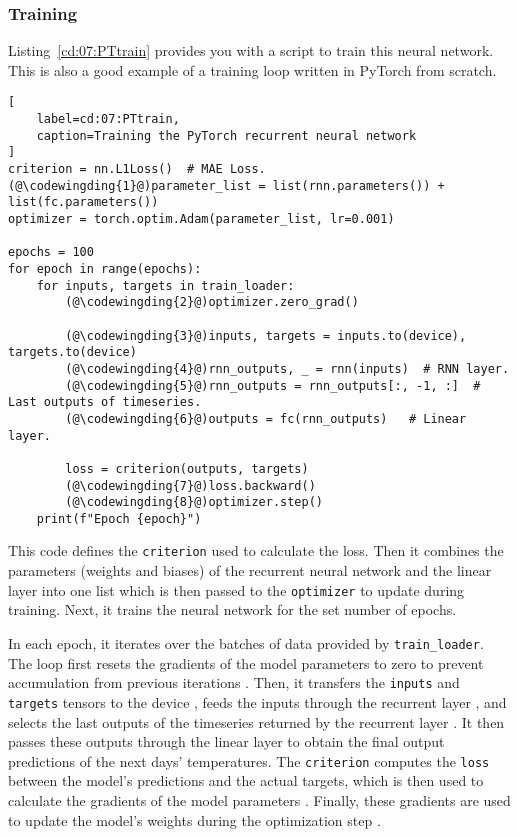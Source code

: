 \subsubsection{Training}

Listing~\ref{cd:07:PTtrain} provides you with a script to train this neural network. This is also a good example of a training loop written in PyTorch from scratch.
\begin{lstlisting}[
    label=cd:07:PTtrain,
    caption=Training the PyTorch recurrent neural network
]
criterion = nn.L1Loss()  # MAE Loss.
(@\codewingding{1}@)parameter_list = list(rnn.parameters()) + list(fc.parameters())
optimizer = torch.optim.Adam(parameter_list, lr=0.001)

epochs = 100
for epoch in range(epochs):
    for inputs, targets in train_loader:
        (@\codewingding{2}@)optimizer.zero_grad()

        (@\codewingding{3}@)inputs, targets = inputs.to(device), targets.to(device)
        (@\codewingding{4}@)rnn_outputs, _ = rnn(inputs)  # RNN layer.
        (@\codewingding{5}@)rnn_outputs = rnn_outputs[:, -1, :]  # Last outputs of timeseries.
        (@\codewingding{6}@)outputs = fc(rnn_outputs)   # Linear layer.
        
        loss = criterion(outputs, targets)
        (@\codewingding{7}@)loss.backward()
        (@\codewingding{8}@)optimizer.step()
    print(f"Epoch {epoch}")
\end{lstlisting}
This code defines the \lstinline{criterion} used to calculate the loss. 
Then it combines the parameters (weights and biases) of the recurrent neural network and the linear layer into one list  which is then passed to the \lstinline{optimizer} to update during training.
Next, it trains the neural network for the set number of epochs.

In each epoch, it iterates over the batches of data provided by \lstinline{train_loader}. 
The loop first resets the gradients of the model parameters to zero to prevent accumulation from previous iterations . 
Then, it transfers the \lstinline{inputs} and \lstinline{targets} tensors to the device , feeds the inputs through the recurrent layer , and selects the last outputs of the timeseries returned by the recurrent layer . 
It then passes these outputs through the linear layer  to obtain the final output predictions of the next days' temperatures. 
The \lstinline{criterion} computes the \lstinline{loss} between the model's predictions and the actual targets, which is then used to calculate the gradients of the model parameters . 
Finally, these gradients are used to update the model's weights during the optimization step .

